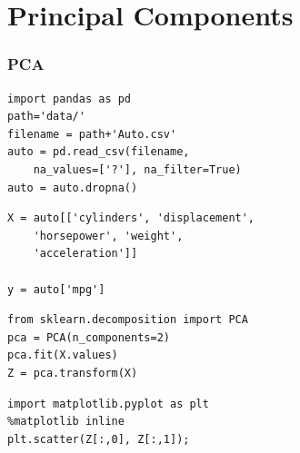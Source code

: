 \section{Principal Components}




\begin{frame}[fragile]\frametitle{PCA}
\tiny	
\begin{lstlisting}
import pandas as pd
path='data/'
filename = path+'Auto.csv'
auto = pd.read_csv(filename, 
	na_values=['?'], na_filter=True)
auto = auto.dropna()
\end{lstlisting} 
\pause
\begin{lstlisting}
X = auto[['cylinders', 'displacement', 
	'horsepower', 'weight', 
	'acceleration']]

y = auto['mpg']
\end{lstlisting} 
\pause
\begin{lstlisting}
from sklearn.decomposition import PCA
pca = PCA(n_components=2)
pca.fit(X.values)
Z = pca.transform(X)
\end{lstlisting} 
\pause
\begin{lstlisting}
import matplotlib.pyplot as plt
%matplotlib inline
plt.scatter(Z[:,0], Z[:,1]);
\end{lstlisting} 
\end{frame}


